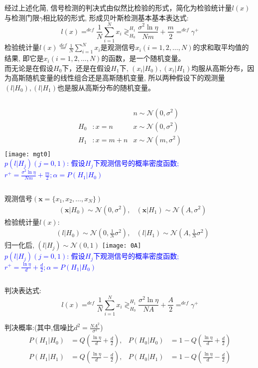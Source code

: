 \begin{frame}
\small
经过上述化简, 信号检测的判决式由似然比检验的形式，简化为检验统计量$l(x)$与检测门限$\gamma$相比较的形式, 形成贝叶斯检测基本基本表达式:
\[
l(x)\mathop{=}^{def}\frac{1}{N}\sum\limits_{i=1}^Nx_i\mathop{\gtrless}_{H_0}^{H_1}\frac{\sigma^2\ln\eta}{Nm}+\frac{m}{2}\mathop{=}^{def}\gamma^+
\]
检验统计量$l(x)\mathop{=}\limits^{def}\frac{1}{N}\sum\limits_{i=1}^Nx_i$是观测信号$x_i(i=1,2,\dots,N)$的求和取平均值的结果, 即它是$x_i(i=1,2,\dots,N)$的函数，是一个随机变量。\\
而无论是在假设$H_0$下，还是在假设$H_1$下, $(x_i|H_0),(x_i|H_1)$均服从高斯分布，因为高斯随机变量的线性组合还是高斯随机变量, 所以两种假设下的观测量$(l|H_0),(l|H_1)$也是服从高斯分布的随机变量。
\begin{columns}
	\begin{align*}
	&&n\sim\mathcal{N}(0,\sigma^2)\\ 
	H_0 &:x=n   &x\sim\mathcal{N}(0,\sigma^2)\\
	H_1 &:x=m+n &x\sim\mathcal{N}(m,\sigma^2)\\
	\end{align*}
	\texttt{[image: mgt0]}\\
	\scriptsize
	\textcolor{blue}{$p(l|H_j)(j=0,1)$: 假设$H_j$下观测信号的概率密度函数; $r^+=\frac{\sigma^2\ln\eta}{Nm}+\frac{m}{2}; \alpha=P(H_1|H_0)$}
\end{columns}
\end{frame}

\begin{frame}[shrink]
\begin{columns}
	观测信号$(\bm{x}=\{x_1,x_2,\dots,x_N\})$
	\begin{align*}
	&(\bm{x}|H_0)\sim\mathcal{N}(0,\sigma^2), &(\bm{x}|H_1)\sim\mathcal{N}(A,\sigma^2)
	\end{align*}
	检验统计量$l(x)$:
	\begin{align*}
	&(l|H_0)\sim\mathcal{N}(0,\frac{1}{N}\sigma^2), &(l|H_1)\sim\mathcal{N}(A,\frac{1}{N}\sigma^2)
	\end{align*}
	归一化后, $(l|H_j)\sim\mathcal{N}(0,1)$
	\texttt{[image: 0A]}\\
	\scriptsize
	\textcolor{blue}{$p(l|H_j)(j=0,1)$: 假设$H_j$下观测信号的概率密度函数; $r^+=\frac{\ln\eta}{d}+\frac{d}{2}; \alpha=P(H_1|H_0)$}
\end{columns}

\bigskip

判决表达式:
\[
l(x)\mathop{=}^{def}\frac{1}{N}\sum\limits_{i=1}^Nx_i\mathop{\gtrless}_{H_0}^{H_1}\frac{\sigma^2\ln\eta}{NA}+\frac{A}{2}\mathop{=}^{def}\gamma^+
\]

判决概率:(其中,信噪比$d^2=\frac{NA^2}{\sigma^2}$)
\begin{align*}
	P(H_1|H_0)&=Q\left(\frac{\ln\eta}{d}+\frac{d}{2}\right), &P(H_0|H_0)&=1-Q\left(\frac{\ln\eta}{d}+\frac{d}{2}\right)\\
	P(H_1|H_1)&=Q\left(\frac{\ln\eta}{d}-\frac{d}{2}\right),
	&P(H_0|H_1)&=1-Q\left(\frac{\ln\eta}{d}-\frac{d}{2}\right)
\end{align*}
\end{frame}

